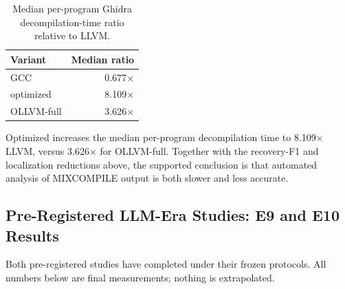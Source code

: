 \documentclass[pdflatex,sn-mathphys-num]{sn-jnl}
\theoremstyle{thmstyleone}%
\theoremstyle{thmstyletwo}%
\theoremstyle{thmstylethree}%
\begin{document}
\begin{table}[!t]
\centering
\footnotesize
\caption{Median per-program Ghidra decompilation-time ratio relative to LLVM.}
\label{tab:ghidra_ratios}
\begin{tabular}{lr}
\toprule
Variant & Median ratio \\
\midrule
GCC & 0.677$\times$ \\
optimized & 8.109$\times$ \\
OLLVM-full & 3.626$\times$ \\
\bottomrule
\end{tabular}
\end{table}

Optimized increases the median per-program decompilation time to 8.109$\times$ LLVM,
versus 3.626$\times$ for OLLVM-full. Together with the recovery-F1 and localization
reductions above, the supported conclusion is that automated analysis of MIXCOMPILE
output is both slower and less accurate.

\subsection{Pre-Registered LLM-Era Studies: E9 and E10 Results}
\label{sec:ongoing}

Both pre-registered studies have completed under their frozen protocols. All
numbers below are final measurements; nothing is extrapolated.
\end{document}
